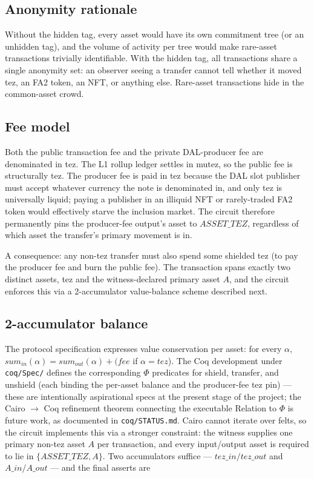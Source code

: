 \documentclass[11pt]{article}
\begin{document}
\subsection{Anonymity rationale}

Without the hidden tag, every asset would have its own commitment
tree (or an unhidden tag), and the volume of activity per tree would
make rare-asset transactions trivially identifiable. With the hidden
tag, all transactions share a single anonymity set: an observer
seeing a transfer cannot tell whether it moved tez, an FA2 token,
an NFT, or anything else. Rare-asset transactions hide in the
common-asset crowd.

\subsection{Fee model}

Both the public transaction fee and the private DAL-producer fee are
denominated in tez. The L1 rollup ledger settles in mutez, so the
public fee is structurally tez. The producer fee is paid in tez
because the DAL slot publisher must accept whatever currency the
note is denominated in, and only tez is universally liquid; paying a
publisher in an illiquid NFT or rarely-traded FA2 token would
effectively starve the inclusion market. The circuit therefore
permanently pins the producer-fee output's asset to \(ASSET\_TEZ\),
regardless of which asset the transfer's primary movement is in.

A consequence: any non-tez transfer must also spend some shielded
tez (to pay the producer fee and burn the public fee). The
transaction spans exactly two distinct assets, tez and the
witness-declared primary asset \(A\), and the circuit enforces this
via a 2-accumulator value-balance scheme described next.

\subsection{2-accumulator balance}

The protocol specification expresses value conservation per asset:
for every \(\alpha\), \(sum_{in}(\alpha) = sum_{out}(\alpha) + (fee\)
if \(\alpha = tez\)). The Coq development under \texttt{coq/Spec/}
defines the corresponding \(\Phi\) predicates for shield, transfer,
and unshield (each binding the per-asset balance and the
producer-fee tez pin) — these are intentionally aspirational specs
at the present stage of the project; the Cairo \(\to\) Coq
refinement theorem connecting the executable Relation to \(\Phi\)
is future work, as documented in \texttt{coq/STATUS.md}.
Cairo cannot iterate over felts, so the circuit
implements this via a stronger constraint: the witness supplies one
primary non-tez asset \(A\) per transaction, and every input/output
asset is required to lie in \(\{ASSET\_TEZ, A\}\). Two accumulators
suffice — \(tez\_in / tez\_out\) and \(A\_in / A\_out\) — and the
final asserts are
\end{document}
